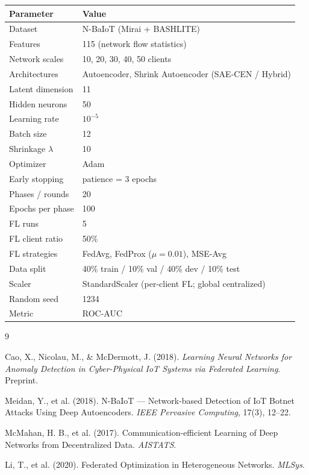 \documentclass[11pt,a4paper]{article}
\begin{document}
\begin{center}
\small
\begin{tabular}{ll}
\toprule
\textbf{Parameter} & \textbf{Value} \\
\midrule
Dataset            & N-BaIoT (Mirai + BASHLITE) \\
Features           & 115 (network flow statistics) \\
Network scales     & 10, 20, 30, 40, 50 clients \\
Architectures      & Autoencoder, Shrink Autoencoder (SAE-CEN / Hybrid) \\
Latent dimension   & 11 \\
Hidden neurons     & 50 \\
Learning rate      & $10^{-5}$ \\
Batch size         & 12 \\
Shrinkage $\lambda$& 10 \\
Optimizer          & Adam \\
Early stopping     & patience = 3 epochs \\
Phases / rounds    & 20 \\
Epochs per phase   & 100 \\
FL runs            & 5 \\
FL client ratio    & 50\% \\
FL strategies      & FedAvg, FedProx ($\mu=0.01$), MSE-Avg \\
Data split         & 40\% train / 10\% val / 40\% dev / 10\% test \\
Scaler             & StandardScaler (per-client FL; global centralized) \\
Random seed        & 1234 \\
Metric             & ROC-AUC \\
\bottomrule
\end{tabular}
\end{center}

\begin{thebibliography}{9}

Cao, X., Nicolau, M., \& McDermott, J. (2018).
\textit{Learning Neural Networks for Anomaly Detection in Cyber-Physical IoT
Systems via Federated Learning}. Preprint.

Meidan, Y., et al. (2018).
N-BaIoT — Network-based Detection of IoT Botnet Attacks Using Deep Autoencoders.
\textit{IEEE Pervasive Computing}, 17(3), 12--22.

McMahan, H. B., et al. (2017).
Communication-efficient Learning of Deep Networks from Decentralized Data.
\textit{AISTATS}.

Li, T., et al. (2020).
Federated Optimization in Heterogeneous Networks. \textit{MLSys}.

\end{thebibliography}
\end{document}
